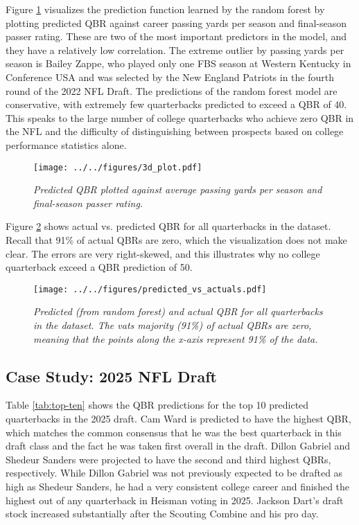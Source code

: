 \documentclass{article}
\begin{document}
Figure \ref{fig:3d-plot} visualizes the prediction function learned by the random forest by plotting predicted QBR against career passing yards per season and final-season passer rating. These are two of the most important predictors in the model, and they have a relatively low correlation. The extreme outlier by passing yards per season is Bailey Zappe, who played only one FBS season at Western Kentucky in Conference USA and was selected by the New England Patriots in the fourth round of the 2022 NFL Draft. The predictions of the random forest model are conservative, with extremely few quarterbacks predicted to exceed a QBR of 40. This speaks to the large number of college quarterbacks who achieve zero QBR in the NFL and the difficulty of distinguishing between prospects based on college performance statistics alone.

\begin{figure}[H]
    \centering
    \texttt{[image: ../../figures/3d\_plot.pdf]}
    \caption{\textit{Predicted QBR plotted against average passing yards per season and final-season passer rating.}}
    \label{fig:3d-plot}
\end{figure}

Figure \ref{fig:predicted-vs-actuals} shows actual vs. predicted QBR for all quarterbacks in the dataset. Recall that 91\% of actual QBRs are zero, which the visualization does not make clear. The errors are very right-skewed, and this illustrates why no college quarterback exceed a QBR prediction of 50.

\begin{figure}[H]
  \centering
  \texttt{[image: ../../figures/predicted\_vs\_actuals.pdf]}
  \caption{\textit{Predicted (from random forest) and actual QBR for all quarterbacks in the dataset. The vats majority (91\%) of actual QBRs are zero, meaning that the points along the x-axis represent 91\% of the data.}}
  \label{fig:predicted-vs-actuals}
\end{figure}

\subsection{Case Study: 2025 NFL Draft}

Table \ref{tab:top-ten} shows the QBR predictions for the top 10 predicted quarterbacks in the 2025 draft. Cam Ward is predicted to have the highest QBR, which matches the common consensus that he was the best quarterback in this draft class and the fact he was taken first overall in the draft. Dillon Gabriel and Shedeur Sanders were projected to have the second and third highest QBRs, respectively. While Dillon Gabriel was not previously expected to be drafted as high as Shedeur Sanders, he had a very consistent college career and finished the highest out of any quarterback in Heisman voting in 2025. Jackson Dart's draft stock increased substantially after the Scouting Combine and his pro day.
\end{document}
